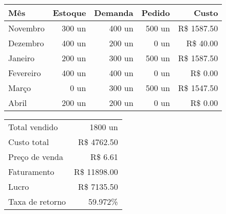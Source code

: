 
	\begin{table}[ht]
		\centering
		\begin{tabular}{lrrrr}
			\toprule
			Mês       & Estoque & Demanda & Pedido &       Custo \\
			\midrule
			Novembro  &  300 un &  400 un & 500 un & R\$ 1587.50 \\
			Dezembro  &  400 un &  200 un &   0 un & R\$   40.00 \\
			Janeiro   &  200 un &  300 un & 500 un & R\$ 1587.50 \\
			Fevereiro &  400 un &  400 un &   0 un & R\$    0.00 \\
			Março     &    0 un &  300 un & 500 un & R\$ 1547.50 \\
			Abril     &  200 un &  200 un &   0 un & R\$    0.00 \\
			\bottomrule
		\end{tabular}
	\end{table}

	\begin{table}[ht]
		\centering
		\begin{tabular}{lr}
			\toprule
			Total vendido   &      1800 un    \\
			Custo total     & R\$  4762.50    \\
			Preço de venda  & R\$     6.61    \\
			Faturamento     & R\$ 11898.00    \\
			Lucro           & R\$  7135.50    \\
			Taxa de retorno &        59.972\% \\
			\bottomrule
		\end{tabular}
	\end{table}

